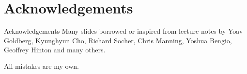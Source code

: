 
\section*{Acknowledgements}

\begin{frame}
\centering
\begin{alertblock}{Acknowledgements}
Many slides borrowed or inspired from lecture notes by Yoav Goldberg, Kyunghyun Cho, Richard Socher, Chris Manning, Yoshua Bengio, Geoffrey Hinton and many others.

\bigskip

All mistakes are my own.
\end{alertblock}
\end{frame}

